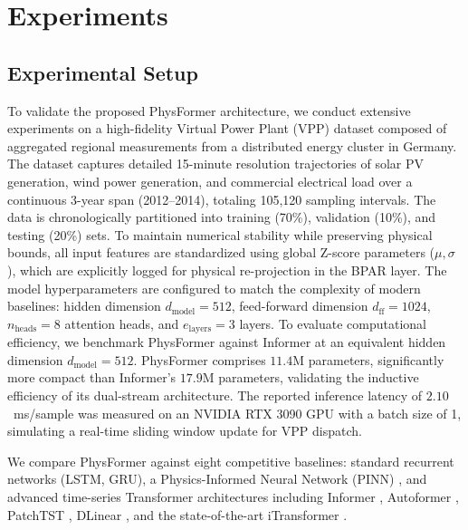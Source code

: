\section{Experiments}
\label{sec:experiments}

\subsection{Experimental Setup}
\label{subsec:exp_setup}

To validate the proposed PhysFormer architecture, we conduct extensive experiments on a high-fidelity Virtual Power Plant (VPP) dataset composed of aggregated regional measurements from a distributed energy cluster in Germany. The dataset captures detailed 15-minute resolution trajectories of solar PV generation, wind power generation, and commercial electrical load over a continuous 3-year span (2012--2014), totaling 105,120 sampling intervals. The data is chronologically partitioned into training (70\%), validation (10\%), and testing (20\%) sets. To maintain numerical stability while preserving physical bounds, all input features are standardized using global Z-score parameters ($\mu, \sigma$), which are explicitly logged for physical re-projection in the BPAR layer. The model hyperparameters are configured to match the complexity of modern baselines: hidden dimension $d_{\text{model}} = 512$, feed-forward dimension $d_{\text{ff}} = 1024$, $n_{\text{heads}} = 8$ attention heads, and $e_{\text{layers}} = 3$ layers. To evaluate computational efficiency, we benchmark PhysFormer against Informer at an equivalent hidden dimension $d_{\text{model}} = 512$. PhysFormer comprises $11.4$M parameters, significantly more compact than Informer's $17.9$M parameters, validating the inductive efficiency of its dual-stream architecture. The reported inference latency of $2.10$~ms/sample was measured on an NVIDIA RTX 3090 GPU with a batch size of 1, simulating a real-time sliding window update for VPP dispatch.

We compare PhysFormer against eight competitive baselines: standard recurrent networks (LSTM, GRU), a Physics-Informed Neural Network (PINN) \cite{Raissi2019}, and advanced time-series Transformer architectures including Informer \cite{Zhou2021informer}, Autoformer \cite{Wu2021autoformer}, PatchTST \cite{Nie2023patchtst}, DLinear \cite{Zeng2023}, and the state-of-the-art iTransformer \cite{Liu2023itransformer}. 

